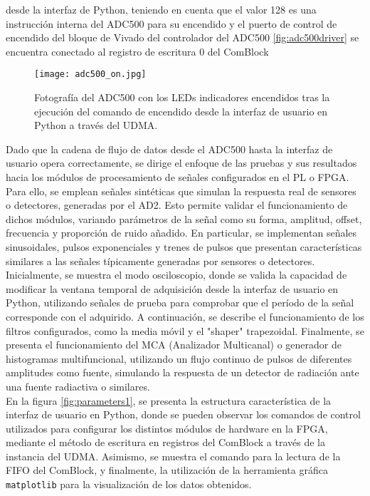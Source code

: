 \documentclass{report}
\begin{document}
\noindent desde la interfaz de Python, teniendo en cuenta que el valor 128 es una instrucción interna del ADC500 para su encendido y el puerto de control de encendido del bloque de Vivado del controlador del ADC500 \ref{fig:adc500driver} se encuentra conectado al registro de escritura 0 del ComBlock\\

\begin{figure}[H]
    \centering
    \texttt{[image: adc500\_on.jpg]}
    \caption{Fotografía del ADC500 con los LEDs indicadores encendidos tras la ejecución del comando de encendido desde la interfaz de usuario en Python a través del UDMA.}
    \label{fig:ADC500_ON}
\end{figure}

\noindent Dado que la cadena de flujo de datos desde el ADC500 hasta la interfaz de usuario opera correctamente, se dirige el enfoque de las pruebas y sus resultados hacia los módulos de procesamiento de señales configurados en el PL o FPGA. Para ello, se emplean señales sintéticas que simulan la respuesta real de sensores o detectores, generadas por el AD2. Esto permite validar el funcionamiento de dichos módulos, variando parámetros de la señal como su forma, amplitud, offset, frecuencia y proporción de ruido añadido. En particular, se implementan señales sinusoidales, pulsos exponenciales y trenes de pulsos que presentan características similares a las señales típicamente generadas por sensores o detectores.\\

\noindent Inicialmente, se muestra el modo osciloscopio, donde se valida la capacidad de modificar la ventana temporal de adquisición desde la interfaz de usuario en Python, utilizando señales de prueba para comprobar que el período de la señal corresponde con el adquirido. A continuación, se describe el funcionamiento de los filtros configurados, como la media móvil y el "shaper" trapezoidal. Finalmente, se presenta el funcionamiento del MCA (Analizador Multicanal) o generador de histogramas multifuncional, utilizando un flujo continuo de pulsos de diferentes amplitudes como fuente, simulando la respuesta de un detector de radiación ante una fuente radiactiva o similares.\\

\noindent En la figura \ref{fig:parameters1}, se presenta la estructura característica de la interfaz de usuario en Python, donde se pueden observar los comandos de control utilizados para configurar los distintos módulos de hardware en la FPGA, mediante el método de escritura en registros del ComBlock a través de la instancia del UDMA. Asimismo, se muestra el comando para la lectura de la FIFO del ComBlock, y finalmente, la utilización de la herramienta gráfica \texttt{matplotlib} para la visualización de los datos obtenidos.
\end{document}
